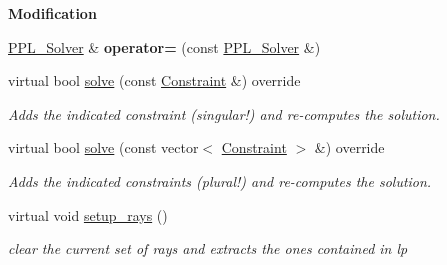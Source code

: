 \begin{Indent}\textbf{ Modification}\par
\begin{DoxyCompactItemize}
\item 
\mbox{\label{group___c_l_s_solvers_af6edf0872b391fbbbe67d02a49795238}} 
\hyperlink{group___c_l_s_solvers_class_l_p___solvers_1_1_p_p_l___solver}{P\+P\+L\+\_\+\+Solver} \& {\bfseries operator=} (const \hyperlink{group___c_l_s_solvers_class_l_p___solvers_1_1_p_p_l___solver}{P\+P\+L\+\_\+\+Solver} \&)
\item 
virtual bool \hyperlink{group___c_l_s_solvers_a9a4a7563d62e4394162aaa4bd08aae29}{solve} (const \hyperlink{group___c_l_s_solvers_class_l_p___solvers_1_1_constraint}{Constraint} \&) override
\begin{DoxyCompactList}\small\item\em Adds the indicated constraint (singular!) and re-\/computes the solution. \end{DoxyCompactList}\item 
virtual bool \hyperlink{group___c_l_s_solvers_a3763d4bc551a98546f1f5be4df49390d}{solve} (const vector$<$ \hyperlink{group___c_l_s_solvers_class_l_p___solvers_1_1_constraint}{Constraint} $>$ \&) override
\begin{DoxyCompactList}\small\item\em Adds the indicated constraints (plural!) and re-\/computes the solution. \end{DoxyCompactList}\item 
\mbox{\label{group___c_l_s_solvers_a1b50fd63c3032192d02d9a1b2411e33a}} 
virtual void \hyperlink{group___c_l_s_solvers_a1b50fd63c3032192d02d9a1b2411e33a}{setup\+\_\+rays} ()
\begin{DoxyCompactList}\small\item\em clear the current set of rays and extracts the ones contained in lp \end{DoxyCompactList}\end{DoxyCompactItemize}
\end{Indent}
